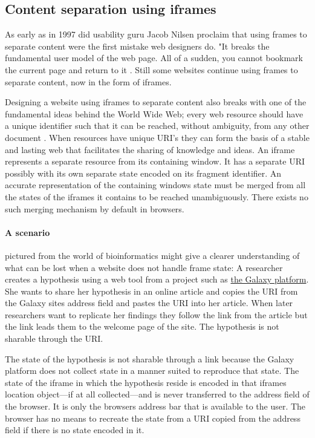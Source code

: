 \documentclass[english]{ifimaster}
\begin{document}
\subsection{Content separation using iframes}
As early as in 1997 did usability guru Jacob Nilsen proclaim that using frames to separate content were the first mistake web designers do. "It breaks the fundamental user model of the web page. All of a sudden, you cannot bookmark the current page and return to it  \parencite{nielsen1997user}. Still some websites continue using frames to separate content, now in the form of iframes. 

Designing a website using iframes to separate content also breaks with one of the fundamental ideas behind the World Wide Web; every web resource should have a unique identifier such that it can be reached, without ambiguity, from any other document \parencite{wwwArchitectureW3C}. When resources have unique URI's they can form the basis of a stable and lasting web that facilitates the sharing of knowledge and ideas. An iframe represents a separate resource from its containing window. It has a separate URI possibly with its own separate state encoded on its fragment identifier. An accurate representation of the containing windows state must be merged from all the states of the iframes it contains to be reached unambiguously. There exists no such merging mechanism by default in browsers. 

\paragraph{A scenario} pictured from the world of bioinformatics might give a clearer understanding of what can be lost when a website does not handle frame state: A researcher creates a hypothesis using a web tool from a project such as \href{https://galaxyproject.org/}{the Galaxy platform}. She wants to share her hypothesis in an online article and copies the URI from the Galaxy sites address field and pastes the URI into her article. When later researchers want to replicate her findings they follow the link from the article but the link leads them to the welcome page of the site. The hypothesis is not sharable through the URI.

The state of the hypothesis is not sharable through a link because the Galaxy platform does not collect state in a manner suited to reproduce that state. The state of the iframe in which the hypothesis reside is encoded in that iframes location object---if at all collected---and is never transferred to the address field of the browser. It is only the browsers address bar that is available to the user. The browser has no means to recreate the state from a URI copied from the address field if there is no state encoded in it. 
\end{document}
